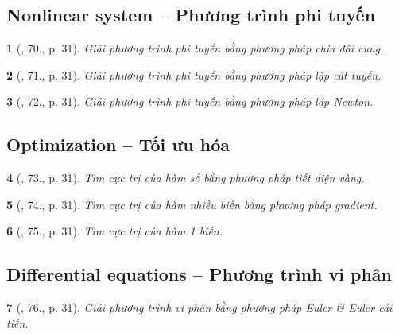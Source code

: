 \documentclass{article}
\newtheorem{baitoan}{}
\begin{document}

\subsection{Nonlinear system -- Phương trình phi tuyến}

\begin{baitoan}[\cite{Doanh_Tuan_Pascal}, 70., p. 31]
	Giải phương trình phi tuyến bằng phương pháp chia đôi cung.
\end{baitoan}

\begin{baitoan}[\cite{Doanh_Tuan_Pascal}, 71., p. 31]
	Giải phương trình phi tuyến bằng phương pháp lặp cát tuyến.
\end{baitoan}

\begin{baitoan}[\cite{Doanh_Tuan_Pascal}, 72., p. 31]
	Giải phương trình phi tuyến bằng phương pháp lặp Newton.
\end{baitoan}


\subsection{Optimization -- Tối ưu hóa}

\begin{baitoan}[\cite{Doanh_Tuan_Pascal}, 73., p. 31]
	Tìm cực trị của hàm số bằng phương pháp tiết diện vàng.
\end{baitoan}

\begin{baitoan}[\cite{Doanh_Tuan_Pascal}, 74., p. 31]
	Tìm cực trị của hàm nhiều biến bằng phương pháp gradient.
\end{baitoan}

\begin{baitoan}[\cite{Doanh_Tuan_Pascal}, 75., p. 31]
	Tìm cực trị của hàm 1 biến.
\end{baitoan}


\subsection{Differential equations -- Phương trình vi phân}

\begin{baitoan}[\cite{Doanh_Tuan_Pascal}, 76., p. 31]
	Giải phương trình vi phân bằng phương pháp Euler \& Euler cải tiến.
\end{baitoan}
\end{document}
